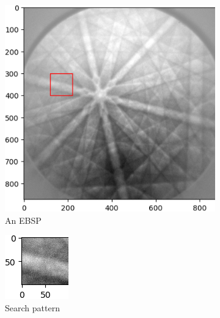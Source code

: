 \begin{figure}
	\centering
	\begin{subfigure}{.5\textwidth}
		\centering
		\includegraphics[width=\linewidth]{img/normalized_initial}
		\caption{An EBSP}
		\label{normalized-initial}
	\end{subfigure}
	\begin{subfigure}{.4\textwidth}
		\centering
		\includegraphics[width=0.4\linewidth]{img/normalized_pattern}
		\caption{Search pattern}
		\label{normalized-pattern}
	\end{subfigure}
	\begin{subfigure}{.49\textwidth}
		\centering

\end{subfigure}
\end{figure}
